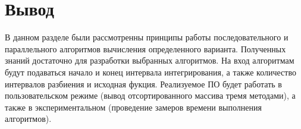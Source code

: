 \section{Вывод}

В данном разделе были рассмотренны принципы работы последовательного и параллельного алгоритмов вычисления определенного варианта. Полученных знаний достаточно для разработки выбранных алгоритмов. На вход алгоритмам будут подаваться начало и конец интервала интегрирования, а также количество интервалов разбиения и исходная фукция. Реализуемое ПО будет работать в пользовательском режиме (вывод отсортированного массива тремя методами), а также в экспериментальном (проведение замеров времени выполнения алгоритмов).